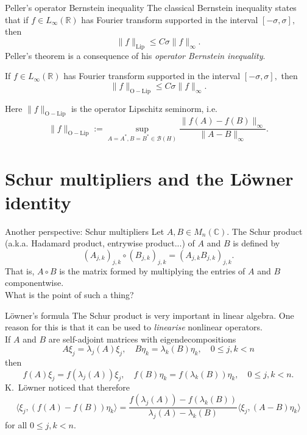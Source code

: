 \documentclass{beamer}
\numberwithin{equation}{section}
\theoremstyle{plain}
\theoremstyle{plain}
\theoremstyle{definition}
\theoremstyle{plain}
\theoremstyle{plain}
\theoremstyle{definition}
\newcommand{\Rl}{\mathbb{R}}
\newcommand{\Cplx}{\mathbb{C}}
\newcommand{\Bc}{\mathcal{B}}
\begin{document}
\begin{frame}{Peller's operator Bernstein inequality}
    The classical Bernstein inequality states that if $f \in L_{\infty}(\Rl)$ has Fourier transform supported in the interval $[-\sigma,\sigma],$ then
    \[
        \|f\|_{\mathrm{Lip}} \leq C\sigma \|f\|_{\infty}.
    \]\pause
    Peller's theorem is a consequence of his \emph{operator Bernstein inequality}.
    \begin{theorem}[Peller (1990)]
        If $f \in L_{\infty}(\Rl)$ has Fourier transform supported in the interval $[-\sigma,\sigma],$ then
        \[
            \|f\|_{\mathrm{O-Lip}} \leq C\sigma\|f\|_\infty.
        \]
    \end{theorem}
    Here $\|f\|_{\mathrm{O-Lip}}$ is the operator Lipschitz seminorm, i.e.
    \[
        \|f\|_{\mathrm{O-Lip}} := \sup_{A=A^*,B=B^*\in \Bc(H)} \frac{\|f(A)-f(B)\|_{\infty}}{\|A-B\|_{\infty}}.
    \]
\end{frame}

\section{Schur multipliers and the L\"owner identity}

\begin{frame}{Another perspective: Schur multipliers}
    Let $A,B \in M_n(\Cplx).$ The Schur product (a.k.a. Hadamard product, entrywise product...) of $A$ and $B$ is defined by
    \[
        (A_{j,k})_{j,k}\circ (B_{j,k})_{j,k} = (A_{j,k}B_{j,k})_{j,k}.
    \]
    \pause
    That is, $A\circ B$ is the matrix formed by multiplying the entries of $A$ and $B$ componentwise.\\

    What is the point of such a thing?
\end{frame}


\begin{frame}{L\"{o}wner's formula}
    The Schur product is very important in linear algebra. One reason for this is that it can be used to \emph{linearise}
    nonlinear operators.\\ \pause
    If $A$ and $B$ are self-adjoint matrices with eigendecompositions
    \[
        A\xi_j= \lambda_j(A)\xi_j,\quad B\eta_k = \lambda_k(B)\eta_k,\quad 0\leq j,k < n
    \]
    then
    \[
        f(A)\xi_j = f(\lambda_j(A))\xi_j,\quad f(B)\eta_k = f(\lambda_k(B))\eta_k,\quad 0\leq j,k < n.
    \]
    K.~L\"owner noticed that therefore
    \[
        \langle \xi_j,(f(A)-f(B))\eta_k\rangle =  \frac{f(\lambda_j(A))-f(\lambda_k(B))}{\lambda_j(A)-\lambda_k(B)}\langle \xi_j,(A-B)\eta_k\rangle
    \]
    for all $0\leq j,k < n.$
\end{frame}
\end{document}
